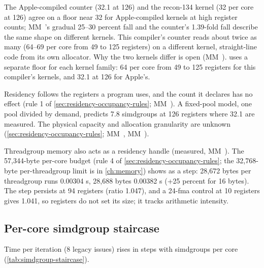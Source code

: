 The Apple-compiled counter (32.1 at 126) and the recon-134 kernel (32 per core at 126) agree on a floor near 32 for
Apple-compiled kernels at high register counts; MM~'s gradual 25–30 percent fall and the counter's 1.39-fold
fall describe the same shape on different kernels. This compiler's counter reads about twice as many (64–69 per core
from 49 to 125 registers) on a different kernel, straight-line code from its own allocator. Why the two kernels differ
is open (MM~).  uses a separate floor for each kernel family: 64 per
core from 49 to 125 registers for this compiler's kernels, and 32.1 at 126 for Apple's.

Residency follows the registers a program uses, and the count it declares has no effect (rule 1 of
\cref{sec:residency-occupancy-rules}; MM~). A fixed-pool model, one pool divided by demand, predicts 7.8
simdgroups at 126 registers where 32.1 are measured. The physical capacity and allocation granularity are unknown (\cref{sec:residency-occupancy-rules}; MM~, MM~).

Threadgroup memory also acts as a residency handle (measured, MM~). The 57,344-byte per-core budget (rule 4 of
\cref{sec:residency-occupancy-rules}; the 32,768-byte per-threadgroup limit is in \cref{ch:memory}) shows as a step: 28,672 bytes per threadgroup runs 0.00304 s, 28,688 bytes 0.00382 s (+25 percent for 16
bytes). The step persists at 94 registers (ratio 1.047), and a 24-fma control at 10 registers gives 1.041, so
registers do not set its size; it tracks arithmetic intensity.

\subsection*{Per-core simdgroup staircase}

Time per iteration (8 legacy issues) rises in steps with simdgroups per core (\cref{tab:simdgroup-staircase}).

